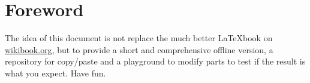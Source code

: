 \section*{Foreword}
The idea of this document is not replace the much better \LaTeX book on \href{http://en.wikibooks.org/wiki/LaTeX}{wikibook.org}, but to provide a short and comprehensive offline version, a repository for copy/paste and a playground to modify parts to test if the result is what you expect. Have fun.